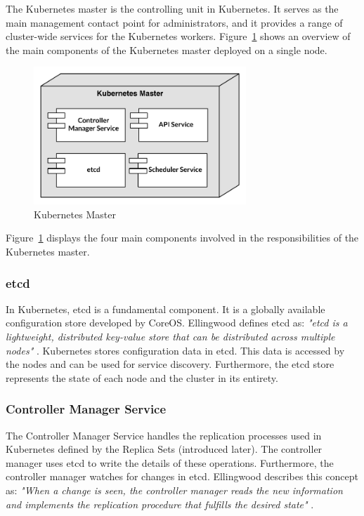 \noindent
The Kubernetes master is the controlling unit in Kubernetes. It serves as the main management contact point for administrators, and it provides a range of cluster-wide services for the Kubernetes workers. Figure~\ref{fig:kubernetes_master_report} shows an overview of the main components of the Kubernetes master deployed on a single node. 

\begin{figure}[H]
    \centering
    \includegraphics[width=8cm]{figures/kubernetes/kubernetes_master}
    \caption{Kubernetes Master}
    \label{fig:kubernetes_master_report}
\end{figure}

\noindent Figure~\ref{fig:kubernetes_master_report} displays the four main components involved in the responsibilities of the Kubernetes master. 

\subsubsection*{etcd}
In Kubernetes, etcd is a fundamental component. It is a globally available configuration store developed by CoreOS. Ellingwood defines etcd as: \textit{"etcd is a lightweight, distributed key-value store that can be distributed across multiple nodes"} \cite[p. 3]{digitalocean2014kubernetes}. Kubernetes stores configuration data in etcd. This data is accessed by the nodes and can be used for service discovery. Furthermore, the etcd store represents the state of each node and the cluster in its entirety.


\subsubsection*{Controller Manager Service}
The Controller Manager Service handles the replication processes used in Kubernetes defined by the Replica Sets (introduced later). The controller manager uses etcd to write the details of these operations. Furthermore, the controller manager watches for changes in etcd. Ellingwood describes this concept as: \textit{"When a change is seen, the controller manager reads the new information and implements the replication procedure that fulfills the desired state"} \cite[p. 4]{digitalocean2014kubernetes}.



